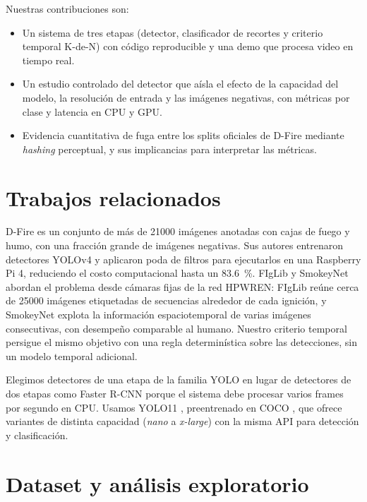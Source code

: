 \documentclass[conference,a4paper]{IEEEtran}
\begin{document}
Nuestras contribuciones son:

\begin{itemize}
\item Un sistema de tres etapas (detector, clasificador de recortes y criterio temporal K-de-N) con código reproducible y una demo que procesa video en tiempo real.
\item Un estudio controlado del detector que aísla el efecto de la capacidad del modelo, la resolución de entrada y las imágenes negativas, con métricas por clase y latencia en CPU y GPU.
\item Evidencia cuantitativa de fuga entre los splits oficiales de D-Fire mediante \textit{hashing} perceptual, y sus implicancias para interpretar las métricas.
\end{itemize}

\section{Trabajos relacionados}

D-Fire \cite{venancio2022dfire} es un conjunto de más de \num{21000} imágenes anotadas con cajas de fuego y humo, con una fracción grande de imágenes negativas. Sus autores entrenaron detectores YOLOv4 y aplicaron poda de filtros para ejecutarlos en una Raspberry Pi 4, reduciendo el costo computacional hasta un \SI{83.6}{\percent}. FIgLib y SmokeyNet \cite{dewangan2022figlib} abordan el problema desde cámaras fijas de la red HPWREN: FIgLib reúne cerca de \num{25000} imágenes etiquetadas de secuencias alrededor de cada ignición, y SmokeyNet explota la información espaciotemporal de varias imágenes consecutivas, con desempeño comparable al humano. Nuestro criterio temporal persigue el mismo objetivo con una regla determinística sobre las detecciones, sin un modelo temporal adicional.

Elegimos detectores de una etapa de la familia YOLO \cite{redmon2016yolo} en lugar de detectores de dos etapas como Faster R-CNN \cite{ren2015faster} porque el sistema debe procesar varios frames por segundo en CPU. Usamos YOLO11 \cite{khanam2024yolo11,ultralytics2024yolo11}, preentrenado en COCO \cite{lin2014coco}, que ofrece variantes de distinta capacidad (\textit{nano} a \textit{x-large}) con la misma API para detección y clasificación.

\section{Dataset y análisis exploratorio}
\end{document}
